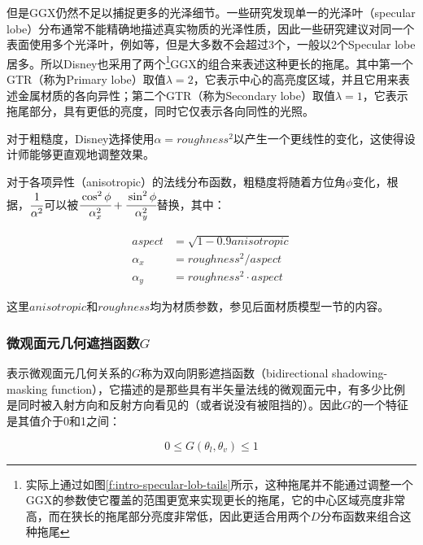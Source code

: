 但是GGX仍然不足以捕捉更多的光泽细节。一些研究发现单一的光泽叶（specular lobe）分布通常不能精确地描述真实物质的光泽性质，因此一些研究建议对同一个表面使用多个光泽叶，例如\cite{a:GlobalOptimizationforEstimatingaMultiple-LobeAnalyticalBRDF}等，但是大多数不会超过3个，一般以2个Specular lobe居多。所以Disney也采用了两个\footnote{实际上通过如图\ref{f:intro-specular-lob-tails}所示，这种拖尾并不能通过调整一个GGX的参数使它覆盖的范围更宽来实现更长的拖尾，它的中心区域亮度非常高，而在狭长的拖尾部分亮度非常低，因此更适合用两个$D$分布函数来组合这种拖尾}GGX的组合来表述这种更长的拖尾。其中第一个GTR（称为Primary lobe）取值$\lambda=2$，它表示中心的高亮度区域，并且它用来表述金属材质的各向异性；第二个GTR（称为Secondary lobe）取值$\lambda=1$，它表示拖尾部分，具有更低的亮度，同时它仅表示各向同性的光照。

对于粗糙度，Disney选择使用$\alpha=roughness^2$以产生一个更线性的变化，这使得设计师能够更直观地调整效果。

对于各项异性（anisotropic）的法线分布函数，粗糙度将随着方位角$\phi$变化，根据\cite{a:PhysicallyBasedShadingatDisney}，$ \cfrac{1}{\alpha^2}$可以被$ \cfrac{\cos^2\phi}{\alpha^2_x}+ \cfrac{\sin^2\phi}{\alpha^2_y}$替换，其中：

\begin{equation}
\begin{aligned}
	aspect&=\sqrt{1-0.9 anisotropic}\\
	\alpha_x &=roughness^2/aspect\\
		\alpha_y &=roughness^2\cdot aspect
\end{aligned}
\end{equation}

\noindent 这里$anisotropic$和$roughness$均为材质参数，参见后面材质模型一节的内容。




\subsubsection{微观面元几何遮挡函数$G$}
表示微观面元几何关系的$G$称为双向阴影遮挡函数（bidirectional shadowing-masking function），它描述的是那些具有半矢量法线的微观面元中，有多少比例是同时被入射方向和反射方向看见的（或者说没有被阻挡的）。因此$G$的一个特征是其值介于0和1之间：

\begin{equation}
	0\leq G(\theta_l,\theta_v)\leq 1
\end{equation}

